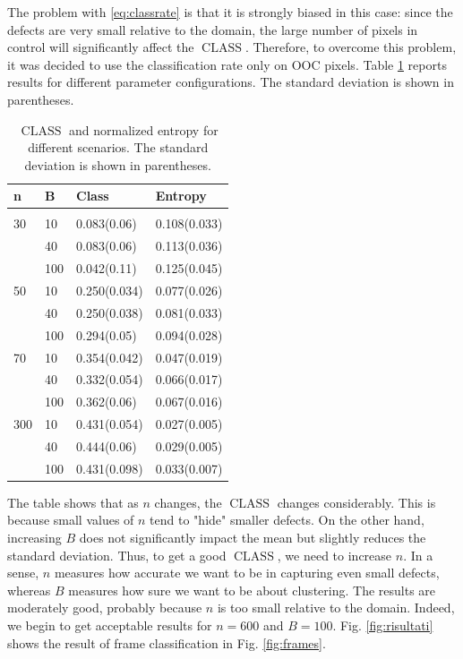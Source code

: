 The problem with \ref{eq:classrate} is that it is strongly biased in this case: since the defects are very small relative to the domain, the large number of pixels in control will significantly affect the $\operatorname{CLASS}$.
Therefore, to overcome this problem, it was decided to use the classification rate only on OOC pixels.
Table \ref{tab:result} reports results for different parameter configurations. The standard deviation is shown in parentheses.

\begin{table}[]
\centering
\begin{tabular}{llll}
\hline
\rowcolor{bluepoli!40}\textbf{n} & \textbf{B} & \textbf{Class} & \textbf{Entropy} \\ \hline\\
30         & 10         & 0.083(0.06)    & 0.108(0.033)     \\[1ex]
           & 40         & 0.083(0.06)    & 0.113(0.036)     \\[1ex]
           & 100        & 0.042(0.11)    & 0.125(0.045)     \\[3ex]
50         & 10         & 0.250(0.034)   & 0.077(0.026)     \\[1ex]
           & 40         & 0.250(0.038)   & 0.081(0.033)     \\[1ex]
           & 100        & 0.294(0.05)    & 0.094(0.028)     \\[3ex]
70         & 10         & 0.354(0.042)   & 0.047(0.019)     \\[1ex]
           & 40         & 0.332(0.054)   & 0.066(0.017)     \\[1ex]
           & 100        & 0.362(0.06)    & 0.067(0.016)     \\[3ex]
300        & 10         & 0.431(0.054)   & 0.027(0.005)     \\[1ex]
           & 40         & 0.444(0.06)    & 0.029(0.005)     \\[1ex]
           & 100        & 0.431(0.098)   & 0.033(0.007)     \\[1ex]
\end{tabular}
\caption{$\operatorname{CLASS}$ and normalized entropy for different scenarios. The standard deviation is shown in parentheses.}
\label{tab:result}
\end{table}
The table shows that as $n$ changes, the $\operatorname{CLASS}$ changes considerably. This is because small values of $n$ tend to "hide" smaller defects. On the other hand, increasing $ B $ does not significantly impact the mean but slightly reduces the standard deviation. Thus, to get a good $\operatorname{CLASS}$, we need to increase $n$. In a sense, $n$ measures how accurate we want to be in capturing even small defects, whereas $B$ measures how sure we want to be about clustering. The results are moderately good, probably because $n$ is too small relative to the domain. Indeed, we begin to get acceptable results for $n=600$ and $B=100$. Fig. \ref{fig:risultati} shows the result of frame classification in Fig. \ref{fig:frames}.
